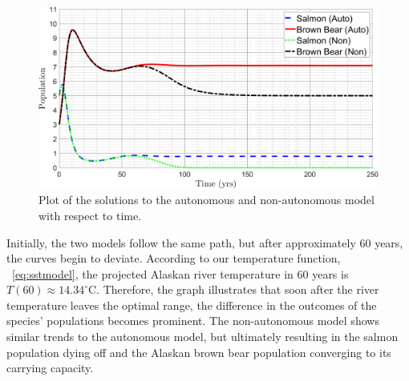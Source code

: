 \begin{figure}[H]
    \centering
    \includegraphics[width=14cm]{Pictures/System ODEs/AutonomousVsNonautonomous.png}
    \caption{\singlespacing
    Plot of the solutions to the autonomous and non-autonomous model with respect to time.}
    \label{fig:AutonomousVsNon-Autonomous}
\end{figure}
Initially, the two models follow the same path, but after approximately 60 years, the curves begin to deviate.
According to our temperature function, \equationautorefname~\eqref{eq:sstmodel}, the projected Alaskan river temperature in 60 years is $T(60)\approx14.34^{\circ}$C.
Therefore, the graph illustrates that soon after the river temperature leaves the optimal range, the difference in the outcomes of the species' populations becomes prominent.
The non-autonomous model shows similar trends to the autonomous model, but ultimately resulting in the salmon population dying off and the Alaskan brown bear population converging to its carrying capacity.










